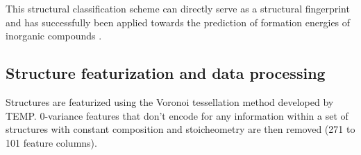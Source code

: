 %
%
This structural classification scheme can directly serve as a structural fingerprint and has successfully been applied towards the prediction of formation energies of inorganic compounds \cite{Jain2018}.



%





%
%
%





\subsection{Structure featurization and data processing}  %
%
Structures are featurized using the Voronoi tessellation method developed by TEMP.
%
0-variance features that don't encode for any information within a set of structures with constant composition and stoicheometry are then removed (\num{271} to \num{101} feature columns).


